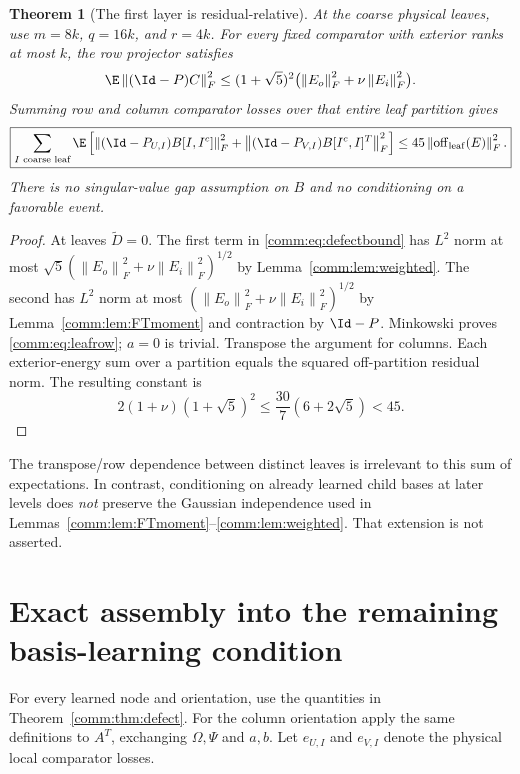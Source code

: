 \documentclass[11pt,oneside,openany,a4paper]{book}
\numberwithin{equation}{chapter}
\newtheorem{theorem}{Theorem}[chapter]
\theoremstyle{definition}
\theoremstyle{remark}
\newcommand{\F}[1]{\left\lVert#1\right\rVert_F}
\begin{document}
\begin{theorem}[The first layer is residual-relative]\label{comm:thm:leaf}
At the coarse physical leaves, use $m=8k$, $q=16k$, and $r=4k$. For every fixed comparator with exterior ranks at most $k$, the row projector satisfies
\begin{equation}\label{comm:eq:leafrow}
 \E\F{(\Id-P)C}^2
 \le(1+\sqrt5)^2\bigl(\F{E_o}^2+\nu\F{E_i}^2\bigr).
\end{equation}
Summing row and column comparator losses over that entire leaf partition gives
\begin{equation}\label{comm:eq:leafglobal}
 \boxed{\sum_{I\text{ coarse leaf}}\E\left[
 \F{(\Id-P_{U,I})B[I,I^c]}^2+
 \F{(\Id-P_{V,I})B[I^c,I]^T}^2\right]
 \le45\F{\operatorname{off}_{\rm leaf}(E)}^2.}
\end{equation}
There is no singular-value gap assumption on $B$ and no conditioning on a favorable event.
\end{theorem}
\begin{proof}
At leaves $\widetilde D=0$. The first term in \eqref{comm:eq:defectbound} has $L^2$ norm at most $\sqrt5(\F{E_o}^2+\nu\F{E_i}^2)^{1/2}$ by Lemma~\ref{comm:lem:weighted}. The second has $L^2$ norm at most $(\F{E_o}^2+\nu\F{E_i}^2)^{1/2}$ by Lemma~\ref{comm:lem:FTmoment} and contraction by $\Id-P$. Minkowski proves \eqref{comm:eq:leafrow}; $a=0$ is trivial. Transpose the argument for columns. Each exterior-energy sum over a partition equals the squared off-partition residual norm. The resulting constant is
\[
 2(1+\nu)(1+\sqrt5)^2\le\frac{30}{7}(6+2\sqrt5)<45.
\]
\end{proof}

The transpose/row dependence between distinct leaves is irrelevant to this sum of expectations. In contrast, conditioning on already learned child bases at later levels does \emph{not} preserve the Gaussian independence used in Lemmas~\ref{comm:lem:FTmoment}--\ref{comm:lem:weighted}. That extension is not asserted.

\section{Exact assembly into the remaining basis-learning condition}
For every learned node and orientation, use the quantities in Theorem~\ref{comm:thm:defect}. For the column orientation apply the same definitions to $A^T$, exchanging $\Omega,\Psi$ and $a,b$. Let $e_{U,I}$ and $e_{V,I}$ denote the physical local comparator losses.
\end{document}
